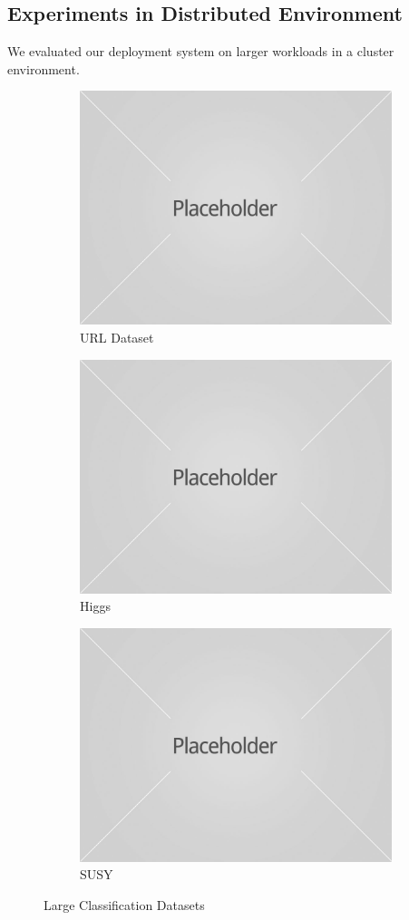 \documentclass{vldb}
\begin{document}
\subsection{Experiments in Distributed Environment}
We evaluated our deployment system on larger workloads in a cluster environment.
\begin{figure}[h]
	\centering
\begin{subfigure}[b]{\columnwidth}
	\includegraphics[width=\columnwidth,height=0.4\columnwidth]{../images/experiment-results/placeholder.jpg}
	\caption{URL Dataset}
	\label{fig:cover-types-quality}
\end{subfigure}
\begin{subfigure}[b]{\columnwidth}
  	\includegraphics[width=\columnwidth,height=0.4\columnwidth]{../images/experiment-results/placeholder.jpg}
	\caption{Higgs}
	\label{fig:higgs-sample-quality}
\end{subfigure}
\begin{subfigure}[b]{\columnwidth}
  	\includegraphics[width=\columnwidth,height=0.4\columnwidth]{../images/experiment-results/placeholder.jpg}
	\caption{SUSY}
	\label{fig:susy-sample-quality}
\end{subfigure}
\caption{Large Classification Datasets}
\label{fig:cluster-classification-results}
\end{figure}
\end{document}
